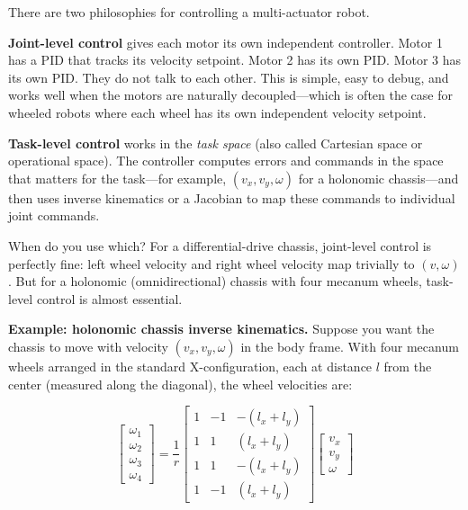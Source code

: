 There are two philosophies for controlling a multi-actuator robot.

\textbf{Joint-level control} gives each motor its own independent controller. Motor 1 has a PID that tracks its velocity setpoint. Motor 2 has its own PID. Motor 3 has its own PID. They do not talk to each other. This is simple, easy to debug, and works well when the motors are naturally decoupled---which is often the case for wheeled robots where each wheel has its own independent velocity setpoint.

\textbf{Task-level control} works in the \textit{task space} (also called Cartesian space or operational space). The controller computes errors and commands in the space that matters for the task---for example, $(v_x, v_y, \omega)$ for a holonomic chassis---and then uses inverse kinematics or a Jacobian to map these commands to individual joint commands.

When do you use which? For a differential-drive chassis, joint-level control is perfectly fine: left wheel velocity and right wheel velocity map trivially to $(v, \omega)$. But for a holonomic (omnidirectional) chassis with four mecanum wheels, task-level control is almost essential.

\textbf{Example: holonomic chassis inverse kinematics.} Suppose you want the chassis to move with velocity $(v_x, v_y, \omega)$ in the body frame. With four mecanum wheels arranged in the standard X-configuration, each at distance $l$ from the center (measured along the diagonal), the wheel velocities are:

\begin{equation}
\begin{bmatrix} \omega_1 \\ \omega_2 \\ \omega_3 \\ \omega_4 \end{bmatrix}
= \frac{1}{r}
\begin{bmatrix}
1 & -1 & -(l_x + l_y) \\
1 &  1 &  (l_x + l_y) \\
1 &  1 & -(l_x + l_y) \\
1 & -1 &  (l_x + l_y)
\end{bmatrix}
\begin{bmatrix} v_x \\ v_y \\ \omega \end{bmatrix}
\end{equation}

